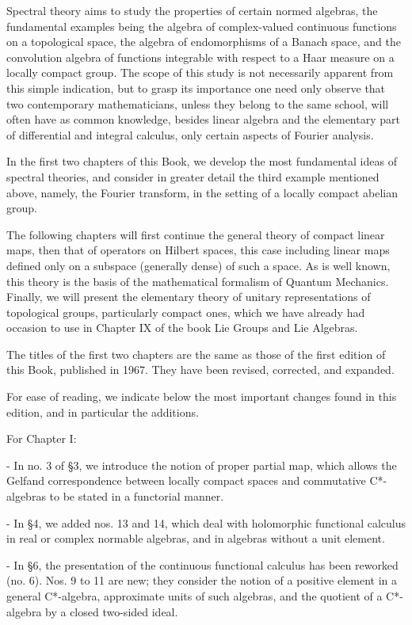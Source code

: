 
Spectral theory aims to study the properties of certain normed algebras, the fundamental examples being the algebra of complex-valued continuous functions on a topological space, the algebra of endomorphisms of a Banach space, and the convolution algebra of functions integrable with respect to a Haar measure on a locally compact group. The scope of this study is not necessarily apparent from this simple indication, but to grasp its importance one need only observe that two contemporary mathematicians, unless they belong to the same school, will often have as common knowledge, besides linear algebra and the elementary part of differential and integral calculus, only certain aspects of Fourier analysis.

In the first two chapters of this Book, we develop the most fundamental ideas of spectral theories, and consider in greater detail the third example mentioned above, namely, the Fourier transform, in the setting of a locally compact abelian group.

The following chapters will first continue the general theory of compact linear maps, then that of operators on Hilbert spaces, this case including linear maps defined only on a subspace (generally dense) of such a space. As is well known, this theory is the basis of the mathematical formalism of Quantum Mechanics. Finally, we will present the elementary theory of unitary representations of topological groups, particularly compact ones, which we have already had occasion to use in Chapter IX of the book Lie Groups and Lie Algebras.

The titles of the first two chapters are the same as those of the first edition of this Book, published in 1967. They have been revised, corrected, and expanded.

For ease of reading, we indicate below the most important changes found in this edition, and in particular the additions.

For Chapter I:

- In no. 3 of §3, we introduce the notion of proper partial map, which allows the Gelfand correspondence between locally compact spaces and commutative C*-algebras to be stated in a functorial manner.

- In §4, we added nos. 13 and 14, which deal with holomorphic functional calculus in real or complex normable algebras, and in algebras without a unit element.

- In §6, the presentation of the continuous functional calculus has been reworked (no. 6). Nos. 9 to 11 are new; they consider the notion of a positive element in a general C*-algebra, approximate units of such algebras, and the quotient of a C*-algebra by a closed two-sided ideal.

